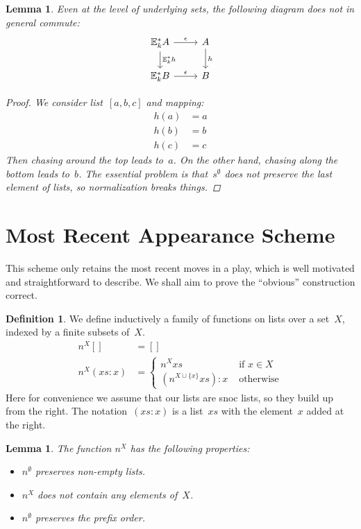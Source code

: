 \documentclass{article}
\theoremstyle{plain}
\newtheorem{lemma}[theorem]{Lemma}
\theoremstyle{definition}
\newtheorem{definition}[theorem]{Definition}
\theoremstyle{remark}
\numberwithin{theorem}{section}
\begin{document}
\begin{lemma}
Even at the level of underlying sets, the following diagram does not in general commute:
\begin{equation*}
\begin{tikzcd}
\mathbb{E}^*_k A \ar[r, "\epsilon"] \ar[d, "\mathbb{E}^*_k h"] & A \ar[d, "h"]\\
\mathbb{E}^*_k B \ar[r, "\epsilon"] &  B
\end{tikzcd}
\end{equation*}
\begin{proof}
We consider list~$[a,b,c]$ and mapping:
\begin{align*}
    h(a) &= a\\
    h(b) &= b\\
    h(c) &= c
\end{align*}
Then chasing around the top leads to~$a$. On the other hand, chasing along the bottom leads to~$b$. The essential problem is that~$s^\emptyset$ does not preserve the last element of lists, so normalization breaks things.
\end{proof}

\end{lemma}

\section{Most Recent Appearance Scheme}
This scheme only retains the most recent moves in a play, which is well motivated and straightforward to describe. We shall aim to prove the ``obvious'' construction correct.
\begin{definition}
We define inductively a family of functions on lists over a set~$X$, indexed by a finite subsets of~$X$.
\begin{align*}
    n^X [] &= []\\
    n^X (xs:x) &= 
    \begin{cases}
    n^X xs &\mbox{ if } x \in X\\
    (n^{X \cup \{ x \} }xs) : x &\mbox{ otherwise}
    \end{cases}
\end{align*}
Here for convenience we assume that our lists are snoc lists, so they build up from the right. The notation~$(xs:x)$ is a list~$xs$ with the element~$x$ added at the right.
\end{definition}
\begin{lemma}
The function $n^X$ has the following properties:
\begin{itemize}
    \item $n^\emptyset$ preserves non-empty lists.
    \item $n^X$ does not contain any elements of~$X$.
    \item $n^\emptyset$ preserves the prefix order.
\end{itemize}
\end{lemma}
\end{document}
